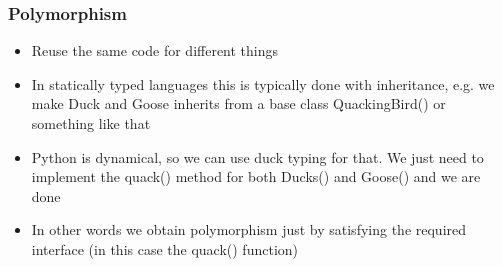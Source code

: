 \documentclass[9pt]{beamer}
\begin{document}
\begin{frame}
  \frametitle{Polymorphism}
  
  \begin{itemize}
    \item Reuse the same code for different things
    \medskip
    \item In statically typed languages this is typically done with inheritance,
          e.g. we make Duck and Goose inherits from a base class QuackingBird()
          or something like that
    \medskip
    \item Python is dynamical, so we can use duck typing for that.
          We just need to implement the quack() method for both Ducks() and Goose() 
          and we are done
    \medskip
    \item In other words we obtain polymorphism just by satisfying the required \alert{interface}
          (in this case the quack() function)
  \end{itemize}
  
\end{frame}
\end{document}

